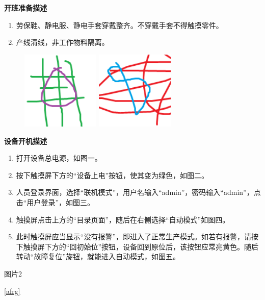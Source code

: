 \documentclass[UTF8]{ctexart}
\newcommand{\smalltitle}[1]{{\zihao{4}\bfseries{#1}}\\}
\begin{document}

\centering
\begin{boxedminipage}{184.6mm}
\centering
\smalltitle{开班准备描述}
\begin{boxedminipage}[t]{101.84mm}
\begin{enumerate}
\item 劳保鞋、静电服、静电手套穿戴整齐。不穿戴手套不得触摸零件。
\item 产线清线，非工作物料隔离。
\end{enumerate}
\end{boxedminipage}
\hfill
\begin{boxedminipage}[t]{78.76mm}
\begin{figure}[H]
\parbox[t]{37.38mm}{
\includegraphics[width=37.38mm]{pic01}
\caption{}\label{afrg}}
\hfill
\parbox[t]{37.38mm}{
\includegraphics[width=37.38mm]{pic02}
\caption{}}
\end{figure}
\end{boxedminipage}
\end{boxedminipage}
\begin{boxedminipage}{184.6mm}
\centering
\smalltitle{设备开机描述}
\begin{boxedminipage}[t]{101.84mm}
\begin{enumerate}
\item 打开设备总电源，如图一。
\item 按下触摸屏下方的“设备上电”按钮，使其变为绿色，如图二。
\item 人员登录界面，选择“联机模式”，用户名输入“admin”，密码输入“admin”，点击“用户登录”，如图三。
\item 触摸屏点击上方的“目录页面”，随后在右侧选择“自动模式”如图四。
\item 此时触摸屏应当显示“没有报警”，即进入了正常生产模式。如若有报警，请按下触摸屏下方的“回初始位”按钮，设备回到原位后，该按钮应常亮黄色。随后转动“故障复位”旋钮，就能进入自动模式，如图五。
\end{enumerate}
\end{boxedminipage}
\hfill
\begin{boxedminipage}[t]{78.76mm}
图片2
\end{boxedminipage}
\end{boxedminipage}
\autoref{afrg}
\end{document}

